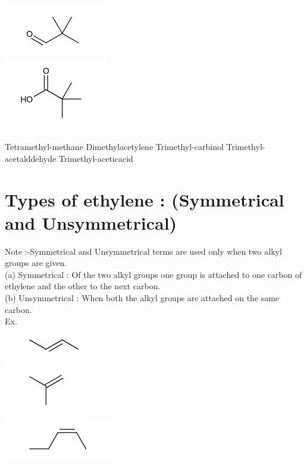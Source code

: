 \documentclass[10pt]{article}
\begin{document}
\includegraphics{smile-a086b2f184130369efaa00fa73d89b817c87d601}\\
\includegraphics{smile-e76e4f7273362deccee30f5587ef3755e9b9a344}

Tetramethyl-methane Dimethylacetylene Trimethyl-carbinol Trimethyl-acetalddehyde Trimethyl-aceticacid

\section*{Types of ethylene : (Symmetrical and Unsymmetrical)}
Note :-Symmetrical and Unsymmetrical terms are used only when two alkyl groups are given.\\
(a) Symmetrical : Of the two alkyl groups one group is attached to one carbon of ethylene and the other to the next carbon.\\
(b) Unsymmetrical : When both the alkyl groups are attached on the same carbon.\\
Ex.\\
\includegraphics{smile-104aaca7d5934eb3eb8139ccb31fa9d3cb43c83d}\\
\includegraphics{smile-45e0a75d0d6830aa857f685d13b1670a238876fb}\\
\includegraphics{smile-87cccd936b3c81cca6bed97ad024494ea6a2cc85}
\end{document}
